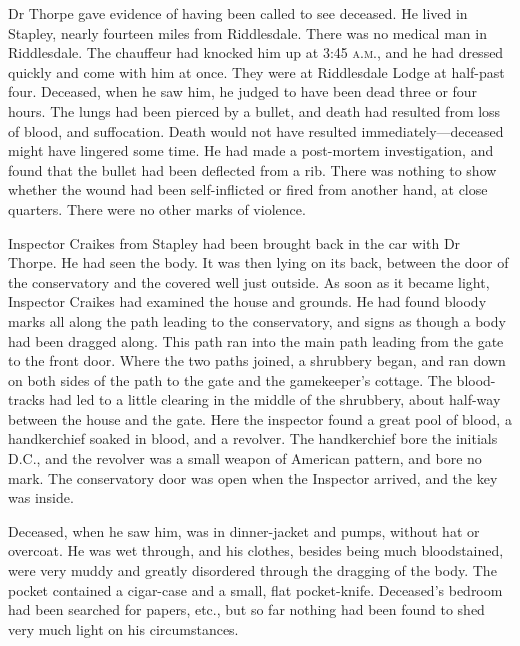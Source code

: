 Dr Thorpe gave evidence of having been called to see deceased. He lived in Stapley, nearly fourteen miles from Riddlesdale. There was no medical man in Riddlesdale. The chauffeur had knocked him up at 3:45 \textsc{a.m.}, and he had dressed quickly and come with him at once. They were at Riddlesdale Lodge at half-past four. Deceased, when he saw him, he judged to have been dead three or four hours. The lungs had been pierced by a bullet, and death had resulted from loss of blood, and suffocation. Death would not have resulted immediately—deceased might have lingered some time. He had made a post-mortem investigation, and found that the bullet had been deflected from a rib. There was nothing to show whether the wound had been self-inflicted or fired from another hand, at close quarters. There were no other marks of violence.

Inspector Craikes from Stapley had been brought back in the car with Dr Thorpe. He had seen the body. It was then lying on its back, between the door of the conservatory and the covered well just outside.  As soon as it became light, Inspector Craikes had examined the house and grounds. He had found bloody marks all along the path leading to the conservatory, and signs as though a body had been dragged along.  This path ran into the main path leading from the gate to the front door.  Where the two paths joined, a shrubbery began, and ran down on both sides of the path to the gate and the gamekeeper's cottage. The blood-tracks had led to a little clearing in the middle of the shrubbery, about half-way between the house and the gate. Here the inspector found a great pool of blood, a handkerchief soaked in blood, and a revolver. The handkerchief bore the initials D.C., and the revolver was a small weapon of American pattern, and bore no mark.  The conservatory door was open when the Inspector arrived, and the key was inside.

Deceased, when he saw him, was in dinner-jacket and pumps, without hat or overcoat. He was wet through, and his clothes, besides being much bloodstained, were very muddy and greatly disordered through the dragging of the body. The pocket contained a cigar-case and a small, flat pocket-knife. Deceased's bedroom had been searched for papers, etc., but so far nothing had been found to shed very much light on his circumstances.

